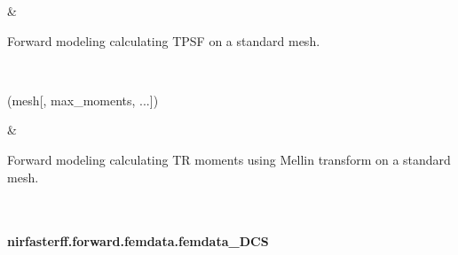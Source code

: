 \documentclass[letterpaper,10pt,english]{sphinxmanual}
\begin{document}
\begin{savenotes}
\begin{longtable}{}
\begin{varwidth}[t]{}
\sphinxbeforeendvarwidth
\end{varwidth}%
&\begin{varwidth}[t]{}
\sphinxAtStartPar
Forward modeling calculating TPSF on a standard mesh.
\sphinxbeforeendvarwidth
\end{varwidth}%
\\
\sphinxhline\begin{varwidth}[t]{}
\sphinxAtStartPar
{\hyperref[\detokenize{_autosummary/nirfasterff.forward.femdata.femdata_stnd_TR_moments:nirfasterff.forward.femdata.femdata_stnd_TR_moments}]{}}(mesh{[}, max\_moments, ...{]})
\sphinxbeforeendvarwidth
\end{varwidth}%
&\begin{varwidth}[t]{}
\sphinxAtStartPar
Forward modeling calculating TR moments using Mellin transform on a standard mesh.
\sphinxbeforeendvarwidth
\end{varwidth}%
\\
\sphinxbottomrule
\end{longtable}
\sphinxtableafterendhook
\sphinxatlongtableend
\end{savenotes}

\sphinxstepscope


\paragraph{nirfasterff.forward.femdata.femdata\_DCS}
\label{\detokenize{_autosummary/nirfasterff.forward.femdata.femdata_DCS:nirfasterff-forward-femdata-femdata-dcs}}\label{\detokenize{_autosummary/nirfasterff.forward.femdata.femdata_DCS::doc}}
\end{document}
